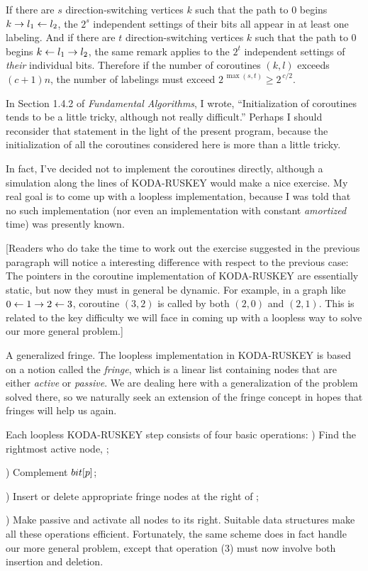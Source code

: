 If there are $s$ direction-switching vertices $k$ such that the path to 0
begins $k\to l_1\gets l_2$, the $2^s$ independent settings of their bits all
appear in at least one labeling.
And if there are $t$ direction-switching vertices $k$ such that the path to 0
begins $k\gets l_1\to l_2$, the same remark applies to the $2^t$ independent
settings of {\it their\/} individual bits.
Therefore if the number of coroutines $(k,l)$ exceeds $(c+1)n$, the
number of labelings must exceed $2^{\,\max(s,t)}\ge2^{\,c/2}$.

\fi

In Section 1.4.2 of {\sl Fundamental Algorithms}, I wrote,
``Initialization of coroutines tends
to be a little tricky, although not really difficult.''
Perhaps I should reconsider that statement in the light of the present
program, because the initialization of all the coroutines considered
here is more than a little tricky.

In fact, I've decided not to implement the coroutines directly,
although a simulation along the lines of {\mc KODA-RUSKEY} would
make a nice exercise. My real goal is to come up with a loopless
implementation, because I was told that no such implementation
(nor even an implementation with constant {\it amortized\/} time)
was presently known.

[Readers who do take the time to work out the exercise suggested in the
previous paragraph will notice a interesting difference with respect to
the previous case: The  pointers in
the coroutine implementation of {\mc KODA-RUSKEY} are essentially
static, but now they must in general be dynamic. For example,
in a graph like $0\gets1\to2\gets3$, coroutine $(3,2)$ is called
by both $(2,0)$ and $(2,1)$. This is related to the key difficulty
we will face in coming up with a loopless way to solve our
more general problem.]

\fi

A generalized fringe. The loopless implementation in {\mc KODA-RUSKEY}
is based on a notion called the {\it fringe}, which is a linear list
containing nodes that are either {\it active\/} or {\it passive}.
We are dealing here with a generalization of the problem solved there,
so we naturally seek an extension of the fringe concept in hopes that
fringes will help us again.

Each loopless {\mc KODA-RUSKEY} step consists of four basic operations:
\smallskip
\indent{}) Find the rightmost active node, ;\par
\indent{}) Complement $\\{bit}[p]$;\par
\indent{}) Insert or delete appropriate
fringe nodes at the right of ;\par
\indent{}) Make  passive and activate all nodes to its right.
\smallskip\noindent
Suitable data structures make all these operations efficient.
Fortunately, the same scheme does in fact handle our more general problem,
except that operation (3) must now involve both insertion and deletion.

